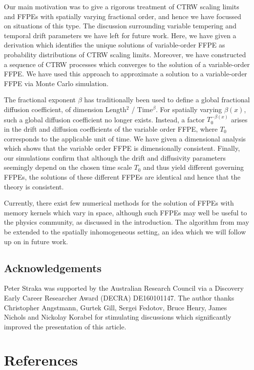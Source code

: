 \documentclass[a4paper,12pt]{elsarticle}
\numberwithin{equation}{section}
\theoremstyle{plain}
\theoremstyle{definition}
\theoremstyle{remark}
\numberwithin{equation}{section}
\newcommand{\1}{\mathbf 1}
\begin{document}
Our main motivation was to give a rigorous treatment of CTRW scaling limits and FFPEs with spatially varying fractional order, and hence we have focussed on situations of this type. The discussion surrounding variable tempering and temporal drift parameters we have left for future work.  
Here, we have given a derivation which identifies the unique solutions of variable-order FFPE as probability distributions of CTRW scaling limits. 
Moreover, we have constructed a sequence of CTRW processes which converges to the solution of a variable-order FFPE.  We have used this approach to approximate a solution to a variable-order FFPE via Monte Carlo simulation.

The fractional exponent $\beta$ has traditionally been used to define a global fractional diffusion coefficient, of dimension Length$^2$ / Time$^\beta$.  For spatially varying $\beta(x)$, such a global diffusion coefficient no longer exists.  
Instead, a factor $T_0^{-\beta(x)}$ arises in the drift and diffusion 
coefficients of the variable order FFPE, where $T_0$ corresponds to the applicable unit of time.  We have given a dimensional analysis which shows that the variable order FFPE is dimensionally consistent.  Finally, our simulations confirm that although the drift and diffusivity parameters seemingly depend on the chosen time scale $T_0$ and thus yield different governing FFPEs, the solutions of these different FFPEs are identical and hence that the theory is consistent. 

Currently, there exist few numerical methods for the solution of FFPEs with memory kernels which vary in space, although such FFPEs may well be useful to the physics community, as discussed in the introduction.  The algorithm from \cite{Gill2016} may be extended to the spatially inhomogeneous setting, an idea which we will follow up on in future work. 


\subsection*{Acknowledgements}
Peter Straka was supported by the Australian Research Council via a 
Discovery Early Career Researcher Award (DECRA) DE160101147. 
The author thanks Christopher Angstmann, Gurtek Gill, 
Sergei Fedotov, Bruce Henry, James Nichols and Nickolay Korabel for stimulating discussions which 
significantly improved the presentation of this article. 

\section*{References}
\end{document}
